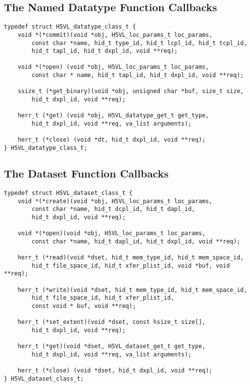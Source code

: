 \documentclass[10pt,a4paper]{article}
\begin{document}
\subsection{The Named Datatype Function Callbacks}

\begin{lstlisting}
typedef struct H5VL_datatype_class_t {
    void *(*commit)(void *obj, H5VL_loc_params_t loc_params, 
        const char *name, hid_t type_id, hid_t lcpl_id, hid_t tcpl_id, 
        hid_t tapl_id, hid_t dxpl_id, void **req);

    void *(*open) (void *obj, H5VL_loc_params_t loc_params, 
        const char * name, hid_t tapl_id, hid_t dxpl_id, void **req);

    ssize_t (*get_binary)(void *obj, unsigned char *buf, size_t size, 
        hid_t dxpl_id, void **req);

    herr_t (*get) (void *obj, H5VL_datatype_get_t get_type, 
        hid_t dxpl_id, void **req, va_list arguments);

    herr_t (*close) (void *dt, hid_t dxpl_id, void **req);
} H5VL_datatype_class_t;
\end{lstlisting}

\subsection{The Dataset Function Callbacks}

\begin{lstlisting}
typedef struct H5VL_dataset_class_t {
    void *(*create)(void *obj, H5VL_loc_params_t loc_params, 
        const char *name, hid_t dcpl_id, hid_t dapl_id, 
        hid_t dxpl_id, void **req);

    void *(*open)(void *obj, H5VL_loc_params_t loc_params, 
        const char *name, hid_t dapl_id, hid_t dxpl_id, void **req);

    herr_t (*read)(void *dset, hid_t mem_type_id, hid_t mem_space_id, 
        hid_t file_space_id, hid_t xfer_plist_id, void *buf, void **req);

    herr_t (*write)(void *dset, hid_t mem_type_id, hid_t mem_space_id, 
        hid_t file_space_id, hid_t xfer_plist_id, 
        const void * buf, void **req);

    herr_t (*set_extent)(void *dset, const hsize_t size[], 
        hid_t dxpl_id, void **req);

    herr_t (*get)(void *dset, H5VL_dataset_get_t get_type, 
        hid_t dxpl_id, void **req, va_list arguments);

    herr_t (*close) (void *dset, hid_t dxpl_id, void **req);
} H5VL_dataset_class_t;
\end{lstlisting}
\end{document}

